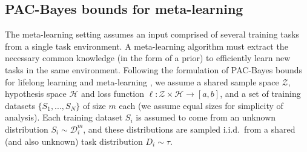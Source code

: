 \documentclass[letterpaper]{article} %
\theoremstyle{definition}
\begin{document}
\subsection{PAC-Bayes bounds for meta-learning} \label{sec:meta}

The meta-learning setting assumes an input comprised of several training tasks from a single task environment. A meta-learning algorithm must extract the necessary common knowledge (in the form of a prior) to efficiently learn new tasks in the same environment. Following the formulation of PAC-Bayes bounds for lifelong learning \citep{Pentina2014} and meta-learning \citep{Amit2018}, we assume a shared sample space $\mathcal{Z}$, hypothesis space $\mathcal{H}$ and loss function $\ell:\mathcal{Z}\times \mathcal{H}\rightarrow [a,b]$, and a set of training datasets $\{S_1,...,S_N\}$ of size $m$ each (we assume equal sizes for simplicity of analysis). Each training dataset $S_i$ is assumed to come from an unknown distribution $S_i\sim \mathcal{D}^m_i$, and these distributions are sampled i.i.d.\ from a shared (and also unknown) task distribution $D_i\sim \tau$.
\end{document}
